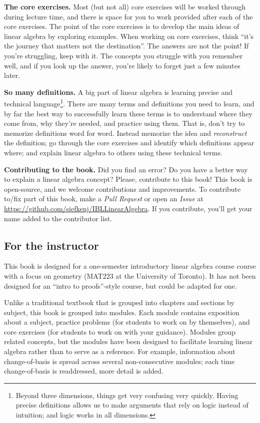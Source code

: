 {\bf The core exercises.} Most (but not all) core exercises will be
worked through during lecture time, and there is space for you to work
provided after each
of the core exercises. The point of the core exercises is to develop the main ideas of
linear algebra by exploring examples. When working on core exercises, think
``it's the journey that matters not the destination''. The
answers are not the point! If you're struggling, keep with it. The
concepts you struggle with you remember well, and if you look up the
answer, you're likely to forget just a few minutes later. 

{\bf So many definitions.} A big part of linear algebra is learning precise and
technical language\footnote{ Beyond three dimensions, things get very confusing
very quickly.  Having precise definitions allows us to make arguments that
rely on logic instead of intuition; and logic works in all dimensions.}.
There are many terms and definitions you need to learn, and by far the
best way to successfully learn these terms is to understand where they
come from, why they're needed, and practice using them. That is, don't
try to memorize definitions word for word. Instead memorize the idea
and \emph{reconstruct} the definition; go through the core exercises and
identify which definitions appear where; and explain linear algebra to
others using these technical terms.

{\bf Contributing to the book.} Did you find an error? Do you
have a better way to explain a linear algebra concept? Please,
contribute to this book!  This book is open-source, and we welcome
contributions and improvements. To contribute to/fix part of
this book, make a \emph{Pull Request} or open an \emph{Issue} at
\url{https://github.com/siefkenj/IBLLinearAlgebra}. If you contribute,
you'll get your name added to the contributor list.


\subsection*{For the instructor}

This book is designed for a one-semester introductory linear algebra course
course with a focus on geometry (MAT223 at the University of Toronto). 
It has not been designed for an ``intro to proofs''-style course, but could be adapted for one.

Unlike a traditional textbook that is grouped into chapters and sections
by subject, this book is grouped into modules. Each module contains exposition
about a subject, practice problems (for students to work on by themselves), and core exercises
(for students to work on with your guidance). Modules group related concepts, but the 
modules have been designed to facilitate learning linear algebra rather than to serve
as a reference. For example, information about change-of-basis is spread across several non-consecutive
modules; each time change-of-basis is readdressed, more detail is added.

